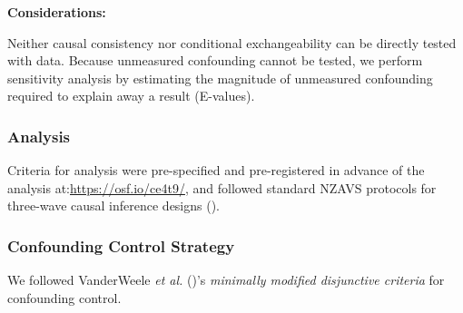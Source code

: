 \documentclass[
  singlecolumn]{article}
\begin{document}
\textbf{Considerations:}

Neither causal consistency nor conditional exchangeability can be
directly tested with data. Because unmeasured confounding cannot be
tested, we perform sensitivity analysis by estimating the magnitude of
unmeasured confounding required to explain away a result (E-values).

\subsubsection{Analysis}\label{analysis}

Criteria for analysis were pre-specified and pre-registered in advance
of the analysis at:\url{https://osf.io/ce4t9/}, and followed standard
NZAVS protocols for three-wave causal inference designs
().

\subsubsection{Confounding Control
Strategy}\label{confounding-control-strategy}

We followed VanderWeele \emph{et al.}
()'s \emph{minimally modified
disjunctive criteria} for confounding control.
\end{document}
